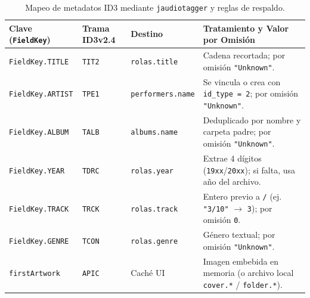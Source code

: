 \documentclass[12pt,a4paper]{article}
\begin{document}
\begin{table}[htbp]
\centering
\footnotesize
\renewcommand{\arraystretch}{0.92}
\begin{tabularx}{\textwidth}{l l l X}
\toprule
\textbf{Clave (\texttt{FieldKey})} & \textbf{Trama ID3v2.4} & \textbf{Destino} & \textbf{Tratamiento y Valor por Omisión} \\
\midrule
\texttt{FieldKey.TITLE} & \texttt{TIT2} & \texttt{rolas.title} & Cadena recortada; por omisión \texttt{"Unknown"}. \\
\texttt{FieldKey.ARTIST} & \texttt{TPE1} & \texttt{performers.name} & Se vincula o crea con \texttt{id\_type = 2}; por omisión \texttt{"Unknown"}. \\
\texttt{FieldKey.ALBUM} & \texttt{TALB} & \texttt{albums.name} & Deduplicado por nombre y carpeta padre; por omisión \texttt{"Unknown"}. \\
\texttt{FieldKey.YEAR} & \texttt{TDRC} & \texttt{rolas.year} & Extrae 4 dígitos (\texttt{19xx}/\texttt{20xx}); si falta, usa año del archivo. \\
\texttt{FieldKey.TRACK} & \texttt{TRCK} & \texttt{rolas.track} & Entero previo a \texttt{/} (ej. \texttt{"3/10"} $\rightarrow$ \texttt{3}); por omisión \texttt{0}. \\
\texttt{FieldKey.GENRE} & \texttt{TCON} & \texttt{rolas.genre} & Género textual; por omisión \texttt{"Unknown"}. \\
\texttt{firstArtwork} & \texttt{APIC} & Caché UI & Imagen embebida en memoria (o archivo local \texttt{cover.*} / \texttt{folder.*}). \\
\bottomrule
\end{tabularx}
\caption{Mapeo de metadatos ID3 mediante \texttt{jaudiotagger} y reglas de respaldo.}
\label{tab:mapeo_id3}
\end{table}
\end{document}
